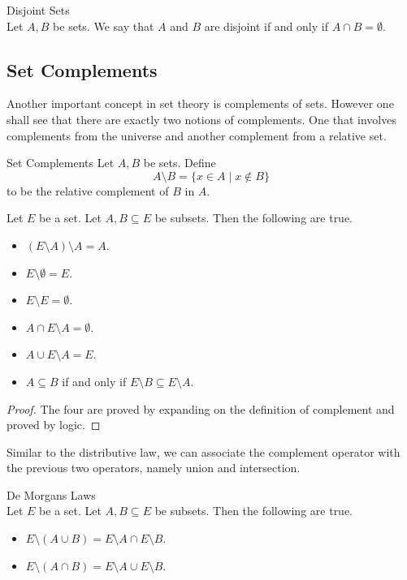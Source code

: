 \documentclass[a4paper]{article}
\begin{document}
\begin{defn}{Disjoint Sets}{}\\
Let $A,B$ be sets. We say that $A$ and $B$ are disjoint if and only if $A\cap B=\emptyset$. 
\end{defn}

\subsection{Set Complements}
Another important concept in set theory is complements of sets. However one shall see that there are exactly two notions of complements. One that involves complements from the universe and another complement from a relative set. 

\begin{defn}{Set Complements}{} Let $A,B$ be sets. Define $$A\setminus B=\{x\in A\;|\;x\notin B\}$$ to be the relative complement of $B$ in $A$. 
\end{defn}

\begin{lmm}{}{} Let $E$ be a set. Let $A,B\subseteq E$ be subsets. Then the following are true. 
\begin{itemize}
\item $(E\setminus A)\setminus A=A$. 
\item $E\setminus\emptyset=E$. 
\item $E\setminus E=\emptyset$. 
\item $A\cap E\setminus A=\emptyset$. 
\item $A\cup E\setminus A=E$. 
\item $A\subseteq B$ if and only if $E\setminus B\subseteq E\setminus A$. 
\end{itemize}
\begin{proof} The four are proved by expanding on the definition of complement and proved by logic. 
\end{proof}
\end{lmm}

Similar to the distributive law, we can associate the complement operator with the previous two operators, namely union and intersection. 

\begin{prp}{De Morgans Laws}{}\\
Let $E$ be a set. Let $A,B\subseteq E$ be subsets. Then the following are true. 
\begin{itemize}
\item $E\setminus(A\cup B)=E\setminus A\cap E\setminus B$. 
\item $E\setminus(A\cap B)=E\setminus A\cup E\setminus B$. 
\end{itemize}
\end{prp}
\end{document}
